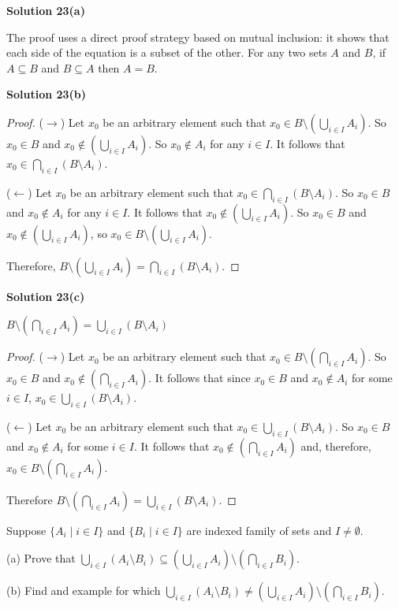 \textbf{Solution 23(a)}

The proof uses a direct proof strategy based on mutual inclusion: it shows that
each side of the equation is a subset of the other. For any two sets $A$ and
$B$, if $A \subseteq B$ and $B \subseteq A$ then $A = B$.

\textbf{Solution 23(b)}
\begin{proof}
    ($\rightarrow$) Let $x_0$ be an arbitrary element such that $x_0 \in B \setminus (\bigcup_{i \in I} A_i)$.
    So $x_0 \in B$ and $x_0 \not \in (\bigcup_{i \in I} A_i)$.
    So $x_0 \not \in A_i$ for any $i \in I$.
    It follows that $x_0 \in \bigcap_{i \in I} (B \setminus A_i)$.

    ($\leftarrow$) Let $x_0$ be an arbitrary element such that $x_0 \in \bigcap_{i \in I}(B \setminus A_i)$.
    So $x_0 \in B$ and $x_0 \not \in A_i$ for any $i \in I$.
    It follows that $x_0 \not \in (\bigcup_{i \in I} A_i)$.
    So $x_0 \in B$ and $x_0 \not \in (\bigcup_{i \in I} A_i)$, so $x_0 \in B \setminus (\bigcup_{i \in I} A_i)$.

    Therefore, $B \setminus (\bigcup_{i \in I} A_i) = \bigcap_{i \in I} (B
        \setminus A_i)$.
\end{proof}

\textbf{Solution 23(c)}

$B \setminus (\bigcap_{i \in I} A_i) = \bigcup_{i \in I} (B \setminus A_i)$

\begin{proof}
    ($\rightarrow$) Let $x_0$ be an arbitrary element such that $x_0 \in B \setminus (\bigcap_{i \in I} A_i)$.
    So $x_0 \in B$ and $x_0 \not \in (\bigcap_{i \in I} A_i)$.
    It follows that since $x_0 \in B$ and $x_0 \not \in A_i$ for some $i \in I$, $x_0 \in \bigcup_{i \in I} (B \setminus A_i)$.

    ($\leftarrow$)  Let $x_0$ be an arbitrary element such that $x_0 \in \bigcup_{i \in I} (B \setminus A_i)$.
    So $x_0 \in B$ and $x_0 \not \in A_i$ for some $i \in I$.
    It follows that $x_0 \not \in (\bigcap_{i \in I} A_i)$ and, therefore,
    $x_0 \in B \setminus (\bigcap_{i \in I} A_i)$.

    Therefore $B \setminus (\bigcap_{i \in I} A_i) = \bigcup_{i \in I} (B \setminus
        A_i)$.
\end{proof}

\begin{tcolorbox}[title=Problem 24, breakable]
    Suppose $\{A_i \mid i \in I\}$ and $\{B_i \mid i \in I\}$ are indexed family of sets and 
    $I \not = \emptyset$.

    (a) Prove that $\bigcup_{i \in I} (A_i \setminus B_i)
        \subseteq (\bigcup_{i \in I} A_i) \setminus (\bigcap_{i \in I} B_i)$.

    (b) Find and example for which $\bigcup_{i \in I} (A_i \setminus B_i)
        \not = (\bigcup_{i \in I} A_i) \setminus (\bigcap_{i \in I} B_i)$.
\end{tcolorbox}

